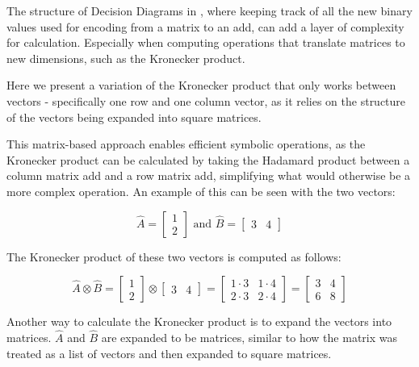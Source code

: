 The structure of Decision Diagrams in \Cupaal, where keeping track of all the new binary values used for encoding from a matrix to an \gls{add}, can add a layer of complexity for calculation.
Especially when computing operations that translate matrices to new dimensions, such as the Kronecker product.

Here we present a variation of the Kronecker product that only works between vectors - specifically one row and one column vector, as it relies on the structure of the vectors being expanded into square matrices.

This matrix-based approach enables efficient symbolic operations, as the Kronecker product can be calculated by taking the Hadamard product between a column matrix \gls{add} and a row matrix \gls{add}, simplifying what would otherwise be a more complex operation.
An example of this can be seen with the two vectors:

\[
    \hat{A} = \begin{bmatrix}
        1 \\
        2
    \end{bmatrix} \text{ and } \hat{B} = \begin{bmatrix}
        3 & 4
    \end{bmatrix}
\]

The Kronecker product of these two vectors is computed as follows:

\begin{equation}
    \hat{A} \otimes \hat{B} =
    \begin{bmatrix}
        1 \\
        2
    \end{bmatrix}
    \otimes
    \begin{bmatrix}
        3 & 4
    \end{bmatrix}
    =
    \begin{bmatrix}
        1 \cdot 3 & 1 \cdot 4 \\
        2 \cdot 3 & 2 \cdot 4
    \end{bmatrix} = \begin{bmatrix}
        3 & 4 \\
        6 & 8
    \end{bmatrix}
    \label{eq:kronecker-product-example}
\end{equation}

Another way to calculate the Kronecker product is to expand the vectors into matrices.
$\hat{A}$ and $\hat{B}$ are expanded to be matrices, similar to how the matrix was treated as a list of vectors and then expanded to square matrices.

